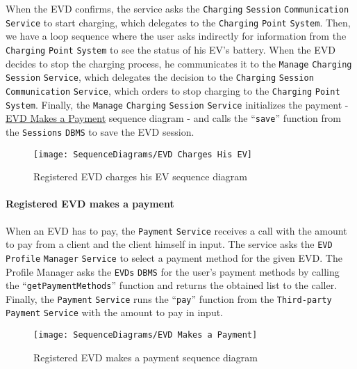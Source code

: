 When the EVD confirms, the service asks the \verb|Charging| \verb|Session| \verb|Communication| \verb|Service| to start charging, which delegates to the \verb|Charging| \verb|Point| \verb|System|.
Then, we have a loop sequence where the user asks indirectly for information from the \verb|Charging| \verb|Point| \verb|System| to see the status of his EV's battery.
When the EVD decides to stop the charging process, he communicates it to the \verb|Manage| \verb|Charging| \verb|Session| \verb|Service|, which delegates the decision to the \verb|Charging| \verb|Session| \verb|Communication| \verb|Service|, which orders to stop charging to the \verb|Charging| \verb|Point| \verb|System|.
Finally, the \verb|Manage| \verb|Charging| \verb|Session| \verb|Service| initializes the payment - \hyperlink{evdmakespayment}{EVD Makes a Payment} sequence diagram - and calls the ``\verb|save|'' function from the \verb|Sessions| \verb|DBMS| to save the EVD session.
\begin{figure}[H]
    \begin{center}
        \texttt{[image: SequenceDiagrams/EVD Charges His EV]}
        \caption{Registered EVD charges his EV sequence diagram}
        \label{fig:evd_charges_his_ev}
    \end{center}
\end{figure}

\paragraph{\texorpdfstring{\protect\hypertarget{evdmakespayment}{Registered EVD makes a payment}}{}}
When an EVD has to pay, the \verb|Payment| \verb|Service| receives a call with the amount to pay from a client and the client himself in input.
The service asks the \verb|EVD| \verb|Profile| \verb|Manager| \verb|Service| to select a payment method for the given EVD\@.
The Profile Manager asks the \verb|EVDs| \verb|DBMS| for the user's payment methods by calling the ``\verb|getPaymentMethods|'' function and returns the obtained list to the caller.
Finally, the \verb|Payment| \verb|Service| runs the ``\verb|pay|'' function from the \verb|Third-party| \verb|Payment| \verb|Service| with the amount to pay in input.
\begin{figure}[H]
    \begin{center}
        \texttt{[image: SequenceDiagrams/EVD Makes a Payment]}
        \caption{Registered EVD makes a payment sequence diagram}
        \label{fig:evd_makes_payment}
    \end{center}
\end{figure}

